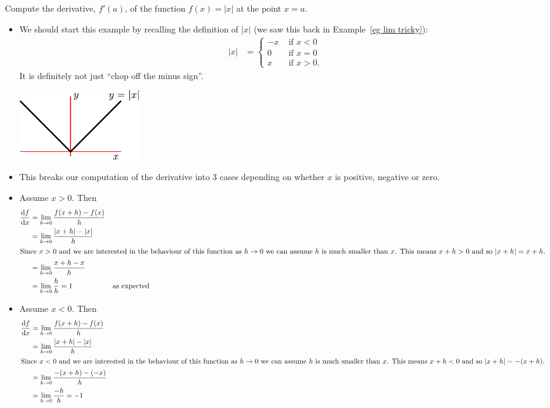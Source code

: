 \begin{eg}\label{eg diff abs}
Compute the derivative, $f'(a)$, of the function $f(x)=|x|$ at the point
$x=a$.
\begin{itemize}
 \item We should start this example by recalling the definition of $|x|$ (we
saw this back in Example~\ref{eg lim tricky}):
\begin{align*}
  |x| &= \begin{cases}
	 -x & \text{ if $x<0$}\\
	 0 & \text{ if $x=0$}\\
	 x & \text{ if $x>0$}.
         \end{cases}
\end{align*}
It is definitely not just ``chop off the minus sign''.
\begin{efig}
\begin{center}
\includegraphics[height=3cm]{../limits/abs}
\end{center}
\end{efig}


\item This breaks our computation of the derivative into 3 cases depending on
whether $x$ is positive, negative or zero.
\item Assume $x>0$. Then
\begin{align*}
  \diff{f}{x}
  &= \lim_{h\to0} \frac{f(x+h)-f(x)}{h} \\
  &= \lim_{h\to0} \frac{|x+h|-|x|}{h} \\
\intertext{Since $x>0$ and we are interested in the behaviour of this function
as $h \to 0$ we can assume $h$ is much smaller than $x$. This means $x+h>0$ and
so $|x+h|=x+h$.}
  &= \lim_{h\to0} \frac{x+h-x}{h} \\
  &= \lim_{h\to0} \frac{h}{h} = 1 &\text{as expected}
\end{align*}
\item Assume $x<0$. Then
\begin{align*}
  \diff{f}{x}
  &= \lim_{h\to0} \frac{f(x+h)-f(x)}{h} \\
  &= \lim_{h\to0} \frac{|x+h|-|x|}{h} \\
\intertext{Since $x<0$ and we are interested in the behaviour of this function
as $h \to 0$ we can assume $h$ is much smaller than $x$. This means $x+h<0$ and
so $|x+h|=-(x+h)$.}
  &= \lim_{h\to0} \frac{-(x+h)-(-x)}{h} \\
  &= \lim_{h\to0} \frac{-h}{h} = -1
\end{align*}


\end{itemize}
\end{eg}

